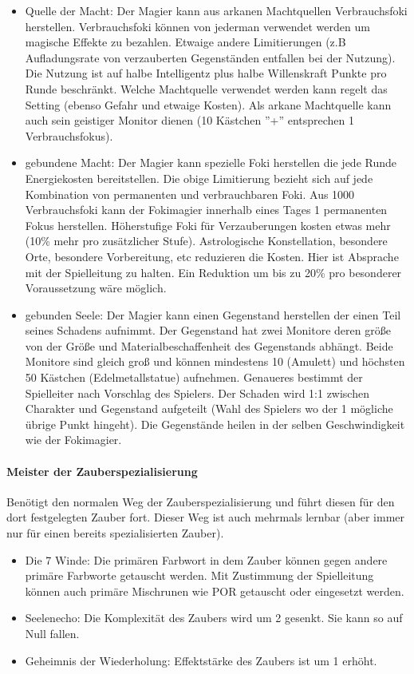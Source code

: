 \documentclass{article}
\begin{document}
\begin{itemize}
\item Quelle der Macht: Der Magier kann aus arkanen Machtquellen Verbrauchsfoki herstellen. Verbrauchsfoki können von jederman verwendet werden um magische Effekte zu bezahlen. Etwaige andere Limitierungen (z.B Aufladungsrate von verzauberten Gegenständen entfallen bei der Nutzung). Die Nutzung ist auf halbe Intelligentz plus halbe Willenskraft Punkte pro Runde beschränkt. Welche Machtquelle verwendet werden kann regelt das Setting (ebenso Gefahr und etwaige Kosten). Als arkane Machtquelle kann auch sein geistiger Monitor dienen (10 Kästchen ''+'' entsprechen 1 Verbrauchsfokus).
\item gebundene Macht: Der Magier kann spezielle Foki herstellen die jede Runde Energiekosten bereitstellen. Die obige Limitierung bezieht sich auf jede Kombination von permanenten und verbrauchbaren Foki. Aus 1000 Verbrauchsfoki kann der Fokimagier innerhalb eines Tages 1 permanenten Fokus herstellen. Höherstufige Foki für Verzauberungen kosten etwas mehr (10\% mehr pro zusätzlicher Stufe). Astrologische Konstellation, besondere Orte, besondere Vorbereitung, etc reduzieren die Kosten. Hier ist Absprache mit der Spielleitung zu halten. Ein Reduktion um bis zu 20\% pro besonderer Voraussetzung wäre möglich. 
\item gebunden Seele: Der Magier kann einen Gegenstand herstellen der einen Teil seines Schadens aufnimmt. Der Gegenstand hat zwei Monitore deren größe von der Größe und Materialbeschaffenheit des Gegenstands abhängt. Beide Monitore sind gleich groß und können mindestens 10 (Amulett) und höchsten 50 Kästchen (Edelmetallstatue) aufnehmen. Genaueres bestimmt der Spielleiter nach Vorschlag des Spielers. Der Schaden wird 1:1 zwischen Charakter und Gegenstand aufgeteilt (Wahl des Spielers wo der 1 mögliche übrige Punkt hingeht). Die Gegenstände heilen in der selben Geschwindigkeit wie der Fokimagier.
\end{itemize}

\paragraph{Meister der Zauberspezialisierung}

Benötigt den normalen Weg der Zauberspezialisierung und führt diesen für den dort festgelegten Zauber fort. Dieser
Weg ist auch mehrmals lernbar (aber immer nur für einen bereits spezialisierten Zauber).

\begin{itemize}
\item Die 7 Winde: Die primären Farbwort in dem Zauber können gegen andere primäre Farbworte getauscht werden. Mit Zustimmung der Spielleitung können auch primäre Mischrunen wie POR getauscht oder eingesetzt werden.
\item Seelenecho: Die Komplexität des Zaubers wird um 2 gesenkt. Sie kann so auf Null fallen.
\item Geheimnis der Wiederholung: Effektstärke des Zaubers ist um 1 erhöht.
\end{itemize}
\end{document}
